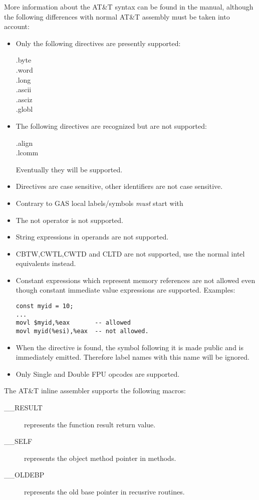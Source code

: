 More information about the AT\&T syntax can be found in the  manual,
although the following differences with normal AT\&T assembly must be taken
into account:
\begin{itemize}
\item  Only the following directives are presently supported:
 \begin{description}
\item[.byte]
\item[.word]
\item[.long]
\item[.ascii]
\item[.asciz]
\item[.globl]
\end{description}
\item  The following directives are recognized but are not
   supported:
\begin{description}
\item[.align]
\item[.lcomm]
\end{description}
Eventually they will be supported.
\item Directives are case sensitive, other identifiers are not case sensitive.
\item  Contrary to GAS local labels/symbols {\em must} start with 
\item  The not operator  is not supported.
\item  String expressions in operands are not supported.
\item  CBTW,CWTL,CWTD and CLTD are not supported, use the normal intel
equivalents instead.
\item  Constant expressions which represent memory references are not
allowed even though constant immediate value expressions are supported.
Examples:
\begin{verbatim}
const myid = 10;
...
movl $myid,%eax       -- allowed
movl myid(%esi),%eax  -- not allowed.
\end{verbatim}
\item When the  directive is found, the symbol following
    it is made public and is immediately emitted.
    Therefore label names with this name will be ignored.
\item  Only Single and Double FPU opcodes are supported.
\end{itemize}

The AT\&T inline assembler supports the following macros:
\begin{description}
\item [\_\_RESULT] represents the function result return value.
\item [\_\_SELF]   represents the object method pointer in methods.
\item [\_\_OLDEBP] represents the old base pointer in recusrive routines.
\end{description}



